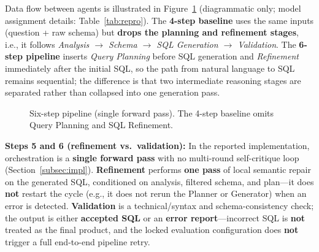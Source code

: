 Data flow between agents is illustrated in Figure~\ref{fig:pipeline} (diagrammatic only; model assignment details: Table~\ref{tab:repro}). The \textbf{4-step baseline} uses the same inputs (question + raw schema) but \textbf{drops the planning and refinement stages}, i.e., it follows \emph{Analysis $\rightarrow$ Schema $\rightarrow$ SQL Generation $\rightarrow$ Validation}. The \textbf{6-step pipeline} inserts \emph{Query Planning} before SQL generation and \emph{Refinement} immediately after the initial SQL, so the path from natural language to SQL remains sequential; the difference is that two intermediate reasoning stages are separated rather than collapsed into one generation pass.

\begin{figure}[t]
\centering
\small
{}
\caption{Six-step pipeline (single forward pass). The 4-step baseline omits Query Planning and SQL Refinement.}
\label{fig:pipeline}
\end{figure}

\textbf{Steps 5 and 6 (refinement vs.\ validation):} In the reported implementation, orchestration is a \textbf{single forward pass} with no multi-round self-critique loop (Section~\ref{subsec:impl}). \textbf{Refinement} performs \textbf{one pass} of local semantic repair on the generated SQL, conditioned on analysis, filtered schema, and plan---it does \textbf{not} restart the cycle (e.g., it does not rerun the Planner or Generator) when an error is detected. \textbf{Validation} is a technical/syntax and schema-consistency check; the output is either \textbf{accepted SQL} or an \textbf{error report}---incorrect SQL is \textbf{not} treated as the final product, and the locked evaluation configuration does \textbf{not} trigger a full end-to-end pipeline retry.

